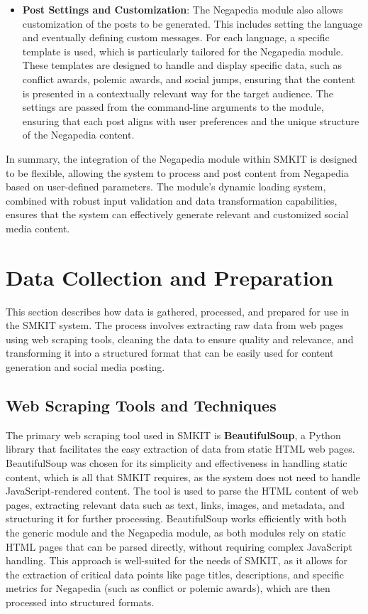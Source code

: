 \begin{itemize}
    \item \textbf{Post Settings and Customization}: The Negapedia module also allows customization of the posts to be generated. This includes setting the language and eventually defining custom messages. For each language, a specific template is used, which is particularly tailored for the Negapedia module. These templates are designed to handle and display specific data, such as conflict awards, polemic awards, and social jumps, ensuring that the content is presented in a contextually relevant way for the target audience. The settings are passed from the command-line arguments to the module, ensuring that each post aligns with user preferences and the unique structure of the Negapedia content.
\end{itemize}

In summary, the integration of the Negapedia module within SMKIT is designed to be flexible, allowing the system to process and post content from Negapedia based on user-defined parameters. The module's dynamic loading system, combined with robust input validation and data transformation capabilities, ensures that the system can effectively generate relevant and customized social media content.

\section{Data Collection and Preparation}
\label{sec:data_collection_and_preparation}
This section describes how data is gathered, processed, and prepared for use in the SMKIT system. The process involves extracting raw data from web pages using web scraping tools, cleaning the data to ensure quality and relevance, and transforming it into a structured format that can be easily used for content generation and social media posting.

\subsection{Web Scraping Tools and Techniques}
\label{subsec:web_scraping_tools_and_techniques}
The primary web scraping tool used in SMKIT is \textbf{BeautifulSoup}, a Python library that facilitates the easy extraction of data from static HTML web pages. BeautifulSoup was chosen for its simplicity and effectiveness in handling static content, which is all that SMKIT requires, as the system does not need to handle JavaScript-rendered content.
The tool is used to parse the HTML content of web pages, extracting relevant data such as text, links, images, and metadata, and structuring it for further processing. BeautifulSoup works efficiently with both the generic module and the Negapedia module, as both modules rely on static HTML pages that can be parsed directly, without requiring complex JavaScript handling.
This approach is well-suited for the needs of SMKIT, as it allows for the extraction of critical data points like page titles, descriptions, and specific metrics for Negapedia (such as conflict or polemic awards), which are then processed into structured formats.

